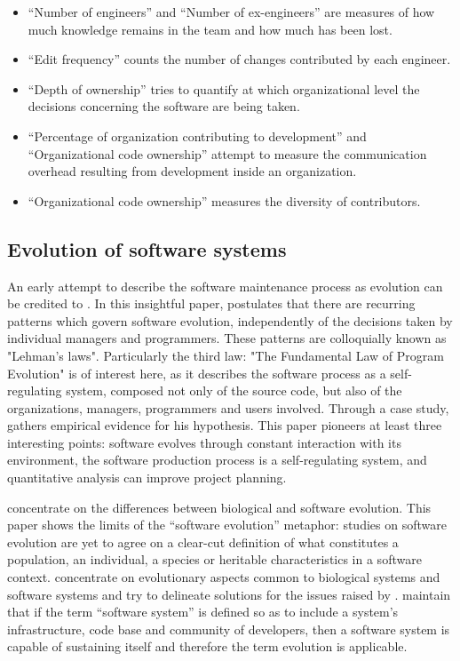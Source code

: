 \begin{itemize}
  \item{“Number of engineers” and “Number of ex-engineers” are measures of how much knowledge remains in the team and how much has been lost.}
  \item{“Edit frequency” counts the number of changes contributed by each engineer.}
  \item{“Depth of ownership” tries to quantify at which organizational level the decisions concerning the software are being taken.}
  \item{“Percentage of organization contributing to development” and “Organizational code ownership” attempt to measure the communication overhead resulting from development inside an organization.}
  \item{“Organizational code ownership” measures the diversity of contributors.}
\end{itemize}

\subsection{Evolution of software systems}
An early attempt to describe the software maintenance process as evolution can be credited to \citet{Lehman1980a}. In this insightful paper, \citet{Lehman1980a} postulates that there are recurring patterns which govern software evolution, independently of the decisions taken by individual managers and programmers. These patterns are colloquially known as "Lehman's laws". Particularly the third law: "The Fundamental Law of Program Evolution" is of interest here, as it describes the software process as a self-regulating system, composed not only of the source code, but also of the organizations, managers, programmers and users involved. Through a case study, \citet{Lehman1980a} gathers empirical evidence for his hypothesis. This paper pioneers at least three interesting points: software evolves through constant interaction with its environment, the software production process is a self-regulating system, and quantitative analysis can improve project planning.

\citet{Nehaniv2006a} concentrate on the differences between biological and software evolution. This paper shows the limits of the “software evolution” metaphor: studies on software evolution are yet to agree on a clear-cut definition of what constitutes a population, an individual, a species or heritable characteristics in a software context. \citet{Yu2006a} concentrate on evolutionary aspects common to biological systems and software systems and try to delineate solutions for the issues raised by \citet{Nehaniv2006a}. \citet{Yu2006a} maintain that if the term “software system” is defined so as to include a system's infrastructure, code base and community of developers, then a software system is capable of sustaining itself and therefore the term evolution is applicable.

